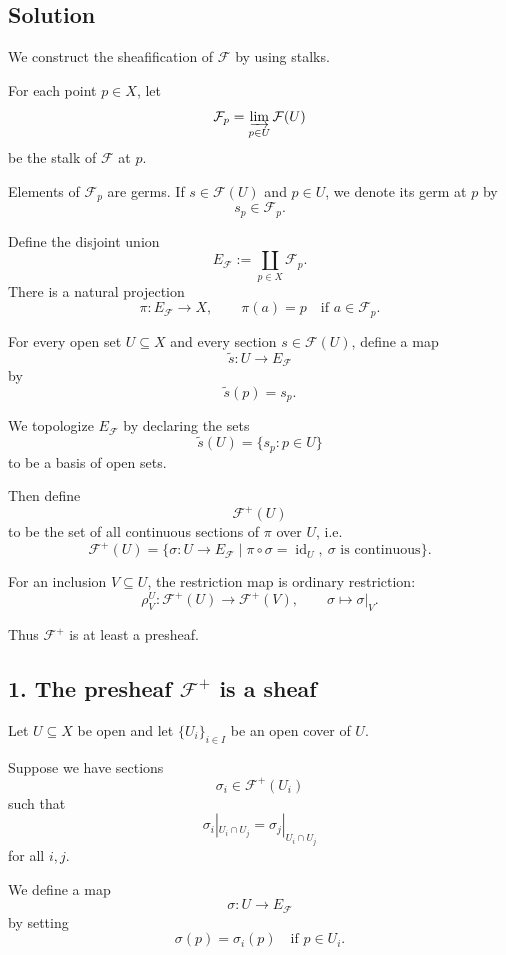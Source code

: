 \documentclass[12pt,a4paper]{article}
\begin{document}
\subsection*{Solution}

We construct the sheafification of $\mathcal F$ by using stalks.

For each point $p \in X$, let
\[
\mathcal F_p
=
\varinjlim_{p \in U} \mathcal F(U)
\]
be the stalk of $\mathcal F$ at $p$.

Elements of $\mathcal F_p$ are germs. If $s \in \mathcal F(U)$ and
$p \in U$, we denote its germ at $p$ by
\[
s_p \in \mathcal F_p.
\]

Define the disjoint union
\[
E_{\mathcal F}
:=
\coprod_{p \in X} \mathcal F_p.
\]
There is a natural projection
\[
\pi : E_{\mathcal F} \longrightarrow X,
\qquad
\pi(a) = p
\quad \text{if } a \in \mathcal F_p.
\]

For every open set $U \subseteq X$ and every section $s \in \mathcal F(U)$,
define a map
\[
\widetilde{s} : U \longrightarrow E_{\mathcal F}
\]
by
\[
\widetilde{s}(p) = s_p.
\]

We topologize $E_{\mathcal F}$ by declaring the sets
\[
\widetilde{s}(U)
=
\{s_p : p \in U\}
\]
to be a basis of open sets.

Then define
\[
\mathcal F^+(U)
\]
to be the set of all continuous sections of $\pi$ over $U$, i.e.
\[
\mathcal F^+(U)
=
\{\sigma : U \to E_{\mathcal F}
\mid \pi \circ \sigma = \operatorname{id}_U,\ \sigma
\text{ is continuous}\}.
\]

For an inclusion $V \subseteq U$, the restriction map is ordinary restriction:
\[
\rho^U_V : \mathcal F^+(U) \longrightarrow \mathcal F^+(V),
\qquad
\sigma \longmapsto \sigma|_V.
\]

Thus $\mathcal F^+$ is at least a presheaf.

\subsection*{1. The presheaf $\mathcal F^+$ is a sheaf}

Let $U \subseteq X$ be open and let $\{U_i\}_{i \in I}$ be an open cover of $U$.

Suppose we have sections
\[
\sigma_i \in \mathcal F^+(U_i)
\]
such that
\[
\sigma_i|_{U_i \cap U_j}
=
\sigma_j|_{U_i \cap U_j}
\]
for all $i,j$.

We define a map
\[
\sigma : U \longrightarrow E_{\mathcal F}
\]
by setting
\[
\sigma(p) = \sigma_i(p)
\quad \text{if } p \in U_i.
\]
\end{document}
